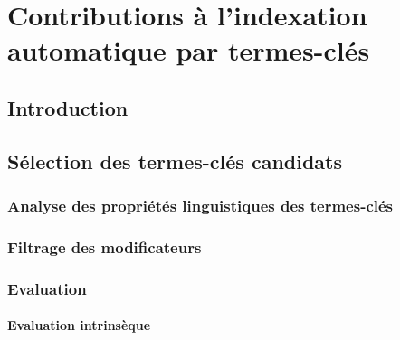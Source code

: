 \chapter{Contributions à l'indexation automatique par termes-clés}
\label{chap:main-automatic_keyphrase_annotation}

  \section{Introduction}
  \label{sec:main-automatic_keyphrase_annotation-introduction}


  \section{Sélection des termes-clés candidats}
  \label{sec:main-automatic_keyphrase_annotation-keyphrase_candidate_selection}
    \subsection{Analyse des propriétés linguistiques des termes-clés}
    \label{subsec:main-automatic_keyphrase_annotation-keyphrase_candidate_selection-analysis_of_keyphrase_properties}

    \subsection{Filtrage des modificateurs}
    \label{subsec:main-automatic_keyphrase_annotation-keyphrase_candidate_selection-modifiers_filtering}

    \subsection{Evaluation}
    \label{subsec:main-automatic_keyphrase_annotation-keyphrase_candidate_selection-evaluation}
      \subsubsection{Evaluation intrinsèque}
      \label{subsubsec:main-automatic_keyphrase_annotation-keyphrase_candidate_selection-evaluation-intrinsic_evaluation}

